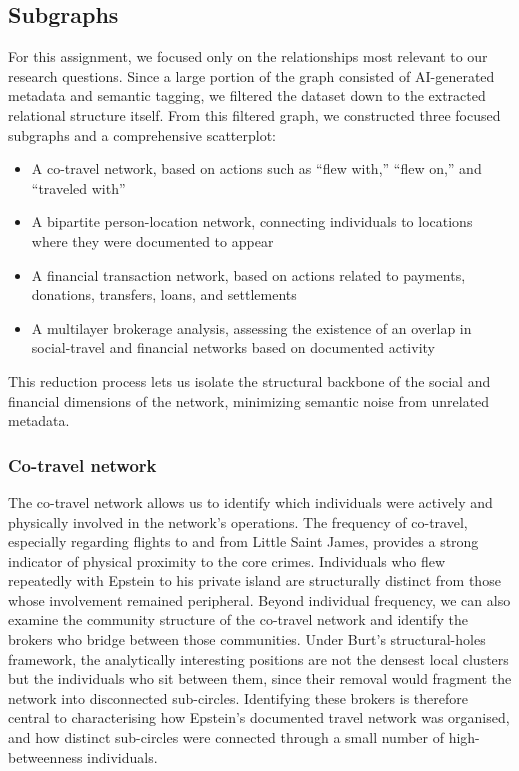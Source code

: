\subsection{Subgraphs}
For this assignment, we focused only on the relationships most relevant to our research questions. Since a large portion of the graph consisted of AI-generated metadata and semantic tagging, we filtered the dataset down to the extracted relational structure itself.
From this filtered graph, we constructed three focused subgraphs and a comprehensive scatterplot:
\begin{itemize}
    \item A co-travel network, based on actions such as ``flew with,'' ``flew on,'' and ``traveled with''
    \item A bipartite person-location network, connecting individuals to locations where they were documented to appear
    \item A financial transaction network, based on actions related to payments, donations, transfers, loans, and settlements
    \item A multilayer brokerage analysis, assessing the existence of an overlap in social-travel and financial networks based on documented activity
\end{itemize}
This reduction process lets us isolate the structural backbone of the social and financial dimensions of the network, minimizing semantic noise from unrelated metadata.
\subsubsection{Co-travel network}
The co-travel network allows us to identify which individuals were actively and physically involved in the network's operations. The frequency of co-travel, especially regarding flights to and from Little Saint James, provides a strong indicator of physical proximity to the core crimes. Individuals who flew repeatedly with Epstein to his private island are structurally distinct from those whose involvement remained peripheral.
Beyond individual frequency, we can also examine the community structure of the co-travel network and identify the brokers who bridge between those communities. Under Burt's structural-holes framework, the analytically interesting positions are not the densest local clusters but the individuals who sit between them, since their removal would fragment the network into disconnected sub-circles. Identifying these brokers is therefore central to characterising how Epstein's documented travel network was organised, and how distinct sub-circles were connected through a small number of high-betweenness individuals.
